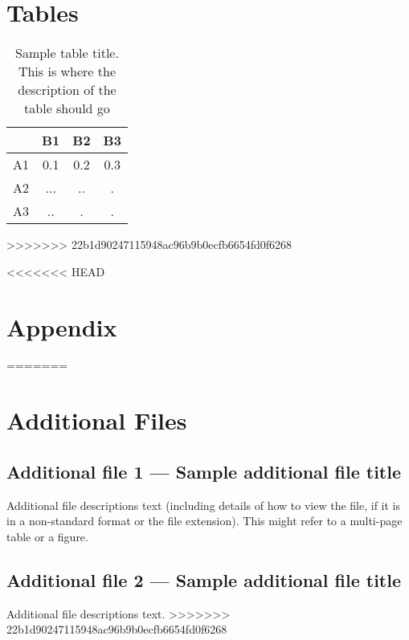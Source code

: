 \documentclass{bmcart}
\begin{document}
\begin{backmatter}
\section*{Tables}
\begin{table}[h!]
\caption{Sample table title. This is where the description of the table should go}
  \begin{tabular}{cccc}
    \hline
    & B1  &B2   & B3\\ \hline
    A1 & 0.1 & 0.2 & 0.3\\
    A2 & ... & ..  & .\\
    A3 & ..  & .   & .\\ \hline
  \end{tabular}
\end{table}
>>>>>>> 22b1d90247115948ac96b9b0ecfb6654fd0f6268


<<<<<<< HEAD

\section*{Appendix}



%
=======
\section*{Additional Files}
  \subsection*{Additional file 1 --- Sample additional file title}
    Additional file descriptions text (including details of how to
    view the file, if it is in a non-standard format or the file extension).  This might
    refer to a multi-page table or a figure.

  \subsection*{Additional file 2 --- Sample additional file title}
    Additional file descriptions text.
>>>>>>> 22b1d90247115948ac96b9b0ecfb6654fd0f6268

\end{backmatter}
\end{document}
